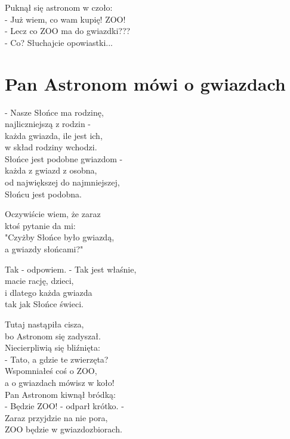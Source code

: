 \documentclass[11pt,a4pape,leqno,twoside]{book}
\begin{document}
Puknął się astronom w czoło:\\
- Już wiem, co wam kupię! ZOO!\\
- Lecz co ZOO ma do gwiazdki???\\
- Co? Słuchajcie opowiastki...

\chapter{Pan Astronom mówi o gwiazdach}
- Nasze Słońce ma rodzinę,\\
najliczniejszą z rodzin -\\
każda gwiazda, ile jest ich,\\
w skład rodziny wchodzi.\\ \vspace{0.1cm}
Słońce jest podobne gwiazdom -\\
każda z gwiazd z osobna,\\
od największej do najmniejszej,\\
Słońcu jest podobna.\\ \vspace{0.1cm}

Oczywiście wiem, że zaraz\\
ktoś pytanie da mi:\\
"Czyżby Słońce było gwiazdą,\\
a gwiazdy słońcami?"\\ \vspace{0.1cm}

Tak - odpowiem. - Tak jest właśnie,\\
macie rację, dzieci,\\
i dlatego każda gwiazda\\
tak jak Słońce świeci.\\ \vspace{0.1cm}

Tutaj nastąpiła cisza,\\
bo Astronom się zadyszał.\\
Niecierpliwią się bliźnięta:\\
- Tato, a gdzie te zwierzęta?\\
Wspomniałeś coś o ZOO,\\
a o gwiazdach mówisz w koło!\\
Pan Astronom kiwnął bródką:\\
- Będzie ZOO! - odparł krótko. -\\
Zaraz przyjdzie na nie pora,\\
ZOO będzie w gwiazdozbiorach.
\end{document}
